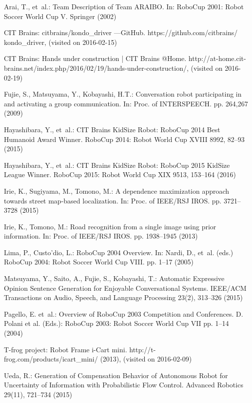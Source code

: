\documentclass{llncs}
\begin{document}
\begin{thebibliography}{10}
\providecommand{\url}[1]{\texttt{#1}}
\providecommand{\urlprefix}{URL }

Arai, T., et~al.: {Team Description of Team ARAIBO}. In: RoboCup 2001: Robot
  Soccer World Cup V. Springer (2002)

CIT Brains: {citbrains/kondo\_driver ---GitHub}.
  {https://github.com/citbrains/\\kondo\_driver}, (visited on 2016-02-15)

CIT Brains: {Hands under construction | CIT Brains @Home}.
  http://at-home.cit-brains.net/index.php/2016/02/19/hands-under-construction/,
  (visited on 2016-02-19)

Fujie, S., Matsuyama, Y., Kobayashi, H.T.: {Conversation robot participating in
  and activating a group communication}. In: Proc. of INTERSPEECH. pp. 264,267
  (2009)

Hayashibara, Y., et~al.: {CIT Brains KidSize Robot: RoboCup 2014 Best Humanoid
  Award Winner}. RoboCup 2014: Robot World Cup XVIII  8992,  82--93 (2015)

Hayashibara, Y., et~al.: {CIT Brains KidSize Robot: RoboCup 2015 KidSize League
  Winner}. RoboCup 2015: Robot World Cup XIX  9513,  153--164 (2016)

Irie, K., Sugiyama, M., Tomono, M.: {A dependence maximization approach towards
  street map-based localization}. In: Proc. of IEEE/RSJ IROS. pp. 3721--3728
  (2015)

Irie, K., Tomono, M.: {Road recognition from a single image using prior
  information}. In: Proc. of IEEE/RSJ IROS. pp. 1938--1945 (2013)

Lima, P., Custo'dio, L.: {RoboCup 2004 Overview}. In: Nardi, D., et~al. (eds.)
  RoboCup 2004: Robot Soccer World Cup VIII. pp. 1--17 (2005)

Matsuyama, Y., Saito, A., Fujie, S., Kobayashi, T.: {Automatic Expressive
  Opinion Sentence Generation for Enjoyable Conversational Systems}. IEEE/ACM
  Transactions on Audio, Speech, and Language Processing  23(2),  313--326
  (2015)

Pagello, E. et~al.: {Overview of
  RoboCup 2003 Competition and Conferences}. D. Polani et al. (Eds.): RoboCup
  2003: Robot Soccer World Cup VII pp. 1--14 (2004)

{T-frog project}: {Robot Frame i-Cart mini}.
  {http://t-frog.com/products/icart\_mini/} (2013), (visited on 2016-02-09)

Ueda, R.: {Generation of Compensation Behavior of Autonomous Robot for
  Uncertainty of Information with Probabilistic Flow Control}. Advanced
  Robotics  29(11),  721--734 (2015)

\end{thebibliography}
\end{document}
